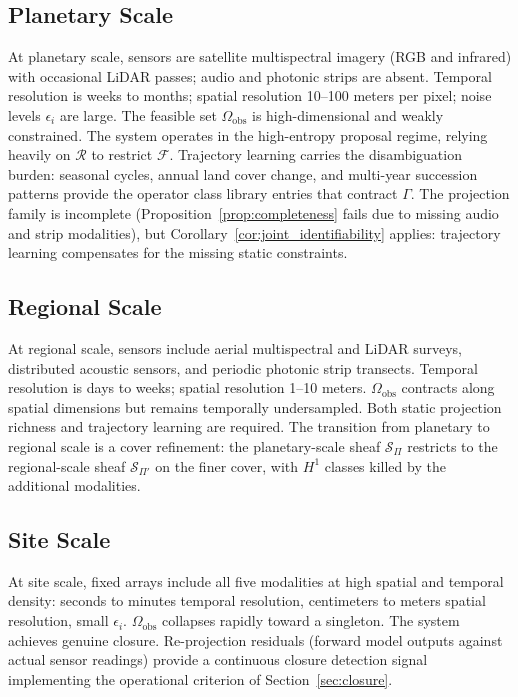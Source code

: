 \documentclass[11pt, oneside]{article}
\begin{document}
\subsection{Planetary Scale}

At planetary scale, sensors are satellite multispectral imagery (RGB and infrared) with
occasional LiDAR passes; audio and photonic strips are absent. Temporal resolution is
weeks to months; spatial resolution 10--100 meters per pixel; noise levels $\epsilon_i$
are large. The feasible set $\Omega_{\mathrm{obs}}$ is high-dimensional and weakly
constrained. The system operates in the high-entropy proposal regime, relying heavily on
$\mathcal{R}$ to restrict $\mathcal{F}$. Trajectory learning carries the disambiguation
burden: seasonal cycles, annual land cover change, and multi-year succession patterns
provide the operator class library entries that contract $\Gamma$. The projection family
is incomplete (Proposition~\ref{prop:completeness} fails due to missing audio and strip
modalities), but Corollary~\ref{cor:joint_identifiability} applies: trajectory learning
compensates for the missing static constraints.

\subsection{Regional Scale}

At regional scale, sensors include aerial multispectral and LiDAR surveys, distributed
acoustic sensors, and periodic photonic strip transects. Temporal resolution is days to
weeks; spatial resolution 1--10 meters. $\Omega_{\mathrm{obs}}$ contracts along spatial
dimensions but remains temporally undersampled. Both static projection richness and
trajectory learning are required. The transition from planetary to regional scale is a
cover refinement: the planetary-scale sheaf $\mathcal{S}_\Pi$ restricts to the
regional-scale sheaf $\mathcal{S}_{\Pi'}$ on the finer cover, with $H^1$ classes killed
by the additional modalities.

\subsection{Site Scale}

At site scale, fixed arrays include all five modalities at high spatial and temporal
density: seconds to minutes temporal resolution, centimeters to meters spatial resolution,
small $\epsilon_i$. $\Omega_{\mathrm{obs}}$ collapses rapidly toward a singleton. The
system achieves genuine closure. Re-projection residuals (forward model outputs against
actual sensor readings) provide a continuous closure detection signal implementing the
operational criterion of Section~\ref{sec:closure}.
\end{document}
